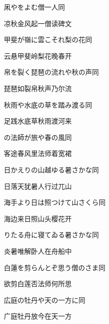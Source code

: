 \begin{haiku}
    {\FH 凩やをよむ僧一人}\hfill{\FH 同}

    {\FK 凉秋金风起一僧读碑文}
\end{haiku}

\begin{haiku}
    {\FH 甲斐が嶺に雲こそれ梨の花}\hfill{\FH 同}

    {\FK 云悬甲斐岭梨花晚春开}
\end{haiku}

\begin{haiku}
    {\FH 帛を裂く琵琶の流れや秋の声}\hfill{\FH 同}

    {\FK 琵琶如裂帛秋声乃尔流}
\end{haiku}

\begin{haiku}
    {\FH 秋雨や水底の草を踏み渡る}\hfill{\FH 同}

    {\FK 足践水底草秋雨渡河来}
\end{haiku}

\begin{haiku}
    {\FH {}の法師が旅や春の風}\hfill{\FH 同}

    {\FK 客途春风里法师着宽裙}
\end{haiku}

\begin{haiku}
    {\FH 日かえりの山越ゆる暑さかな}\hfill{\FH 同}

    {\FK 日落天犹暑人行过兀山}
\end{haiku}

\begin{haiku}
    {\FH 海手より日は照つけて山さくら}\hfill{\FH 同}

    {\FK 海边来日照山头樱花开}
\end{haiku}

\begin{haiku}
    {\FH {}りたる舟に寝てゐる暑さかな}\hfill{\FH 同}

    {\FK 炎暑唯解卧人在舟船中}
\end{haiku}

\begin{haiku}
    {\FH 白蓮を剪らんとぞ思う僧のさま}\hfill{\FH 同}

    {\FK 欲剪白莲否法师何所思}
\end{haiku}

\begin{haiku}
    {\FH 広庭の牡丹や天の一方に}\hfill{\FH 同}

    {\FK 广庭牡丹放今在天一方}
\end{haiku}

